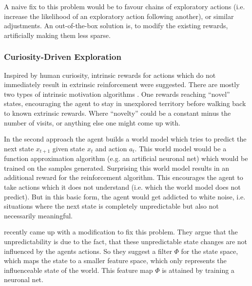 A naive fix to this problem would be to favour chains of exploratory actions (i.e. increase the likelihood of an exploratory action following another), or similar adjustments. An out-of-the-box solution is, to modify the existing rewards, artificially making them less sparse. 

\subsubsection{Curiosity-Driven Exploration}

Inspired by human curiosity, intrinsic rewards for actions which do not immediately result in extrinsic reinforcement were suggested. There are mostly two types of intrinsic motivation algorithms \parencite{pathakCuriosityDrivenExplorationSelfSupervised2017}. One rewards reaching ``novel'' states, encouraging the agent to stay in unexplored territory before walking back to known extrinsic rewards. Where ``novelty'' could be a constant minus the number of visits, or anything else one might come up with. 

In the second approach the agent builds a world model which tries to predict the next state \(x_{t+1}\) given state \(x_t\) and action \(a_t\). This world model would be a function approximation algorithm (e.g. an artificial neuronal net) which would be trained on the samples generated. Surprising this world model results in an additional reward for the reinforcement algorithm. This encourages the agent to take actions which it does not understand (i.e. which the world model does not predict). But in this basic form, the agent would get addicted to white noise, i.e. situations where the next state is completely unpredictable but also not necessarily meaningful.

\textcite{pathakCuriosityDrivenExplorationSelfSupervised2017}
recently came up with a modification to fix this problem. They argue that the unpredictability is due to the fact, that these unpredictable state changes are not influenced by the agents actions. 
So they suggest a filter \(\Phi\) for the state space, which maps the state to a smaller feature space, which only represents the influenceable state of the world. This feature map \(\Phi\) is attained by training a neuronal net.

